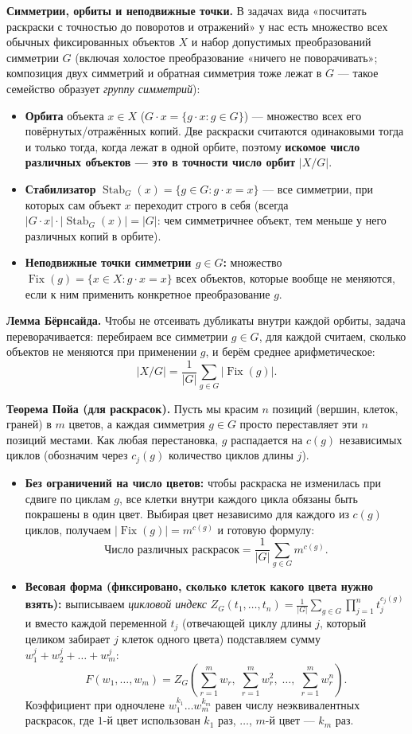 \documentclass[10pt,a4paper]{article}
\DeclareMathOperator{\Fix}{Fix}
\DeclareMathOperator{\Stab}{Stab}
\begin{document}
\textbf{Симметрии, орбиты и неподвижные точки.} В задачах вида «посчитать раскраски с точностью до поворотов и отражений» у нас есть множество всех обычных фиксированных объектов $X$ и набор допустимых преобразований симметрии $G$ (включая холостое преобразование «ничего не поворачивать»; композиция двух симметрий и обратная симметрия тоже лежат в $G$ — такое семейство образует \emph{группу симметрий}):
\begin{itemize}
  \item \textbf{Орбита} объекта $x \in X$ ($G \cdot x = \{g \cdot x : g \in G\}$) — множество всех его повёрнутых/отражённых копий. Две раскраски считаются одинаковыми тогда и только тогда, когда лежат в одной орбите, поэтому \textbf{искомое число различных объектов — это в точности число орбит} $|X / G|$.
  \item \textbf{Стабилизатор} $\Stab_G(x) = \{g \in G : g \cdot x = x\}$ — все симметрии, при которых сам объект $x$ переходит строго в себя (всегда $|G \cdot x| \cdot |\Stab_G(x)| = |G|$: чем симметричнее объект, тем меньше у него различных копий в орбите).
  \item \textbf{Неподвижные точки симметрии $g \in G$:} множество $\Fix(g) = \{x \in X : g \cdot x = x\}$ всех объектов, которые вообще не меняются, если к ним применить конкретное преобразование $g$.
\end{itemize}

\textbf{Лемма Бёрнсайда.} Чтобы не отсеивать дубликаты внутри каждой орбиты, задача переворачивается: перебираем все симметрии $g \in G$, для каждой считаем, сколько объектов не меняются при применении $g$, и берём среднее арифметическое:
\[
  |X / G| = \frac{1}{|G|} \sum_{g \in G} |\Fix(g)|.
\]

\textbf{Теорема Пойа (для раскрасок).} Пусть мы красим $n$ позиций (вершин, клеток, граней) в $m$ цветов, а каждая симметрия $g \in G$ просто переставляет эти $n$ позиций местами. Как любая перестановка, $g$ распадается на $c(g)$ независимых циклов (обозначим через $c_j(g)$ количество циклов длины $j$).
\begin{itemize}
  \item \textbf{Без ограничений на число цветов:} чтобы раскраска не изменилась при сдвиге по циклам $g$, все клетки внутри каждого цикла обязаны быть покрашены в один цвет. Выбирая цвет независимо для каждого из $c(g)$ циклов, получаем $|\Fix(g)| = m^{c(g)}$ и готовую формулу:
  \[
    \text{Число различных раскрасок} = \frac{1}{|G|} \sum_{g \in G} m^{c(g)}.
  \]
  \item \textbf{Весовая форма (фиксировано, сколько клеток какого цвета нужно взять):} выписываем \emph{цикловой индекс} $Z_G(t_1, \dots, t_n) = \frac{1}{|G|} \sum_{g \in G} \prod_{j=1}^n t_j^{c_j(g)}$ и вместо каждой переменной $t_j$ (отвечающей циклу длины $j$, который целиком забирает $j$ клеток одного цвета) подставляем сумму $w_1^j + w_2^j + \dots + w_m^j$:
  \[
    F(w_1, \dots, w_m) = Z_G\!\left(\sum_{r=1}^{m} w_r,\; \sum_{r=1}^{m} w_r^2,\; \dots,\; \sum_{r=1}^{m} w_r^n\right).
  \]
  Коэффициент при одночлене $w_1^{k_1} \dots w_m^{k_m}$ равен числу неэквивалентных раскрасок, где $1$-й цвет использован $k_1$ раз, $\dots$, $m$-й цвет — $k_m$ раз.
\end{itemize}
\end{document}
